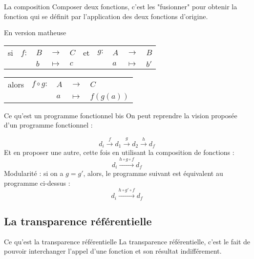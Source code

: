 \documentclass[handout]{beamer}
\begin{document}
  \begin{frame}{La composition}
   Composer deux fonctions, c'est les "fusionner" pour obtenir la fonction
   qui se définit par l'application des deux fonctions d'origine.
   \pause
   \begin{block}{En version matheuse}
    \begin{tabular}{l l l l l l l l l l}
     si & $f :$ & $B$ & $\rightarrow$ & $C$ &
     et & $g :$ & $A$ & $\rightarrow$ & $B$ \\
        &       & $b$ & $\mapsto$     & $c$ &
        &       & $a$ & $\mapsto$     & $b'$ \\
    \end{tabular} \newline \newline
    \begin{tabular}{l l l l l}
     alors & $f \circ g :$ & $A$ & $\rightarrow$ & $C$ \\
           &               & $a$ & $\mapsto$     & $f(g(a))$ \\
    \end{tabular}
   \end{block}
  \end{frame}


  \begin{frame}{Ce qu'est un programme fonctionnel bis}
   On peut reprendre la vision proposée d'un programme fonctionnel :
   
   \[
    d_i \overset{f}   {\longrightarrow}
    d_1 \overset{g}   {\longrightarrow}
    d_2 \overset{h} {\longrightarrow}
    d_f
   \]
   Et en proposer une autre, cette fois en utilisant la composition de
   fonctions :
    \[
    d_i \overset{h \circ g \circ f}   {\longrightarrow} d_f
   \]
   \pause
   Modularité : si on a $g = g'$, alors, 
   le programme suivant est équivalent au programme ci-dessus :
    \[
    d_i \overset{h \circ g' \circ f}   {\longrightarrow} d_f
   \]
  \end{frame}





 \subsection{La transparence référentielle}
  \begin{frame}{Ce qu'est la transparence référentielle}
   La transparence référentielle, c'est le fait de pouvoir interchanger l'appel
   d'une fonction et son résultat indifférement.
  \end{frame}
\end{document}
